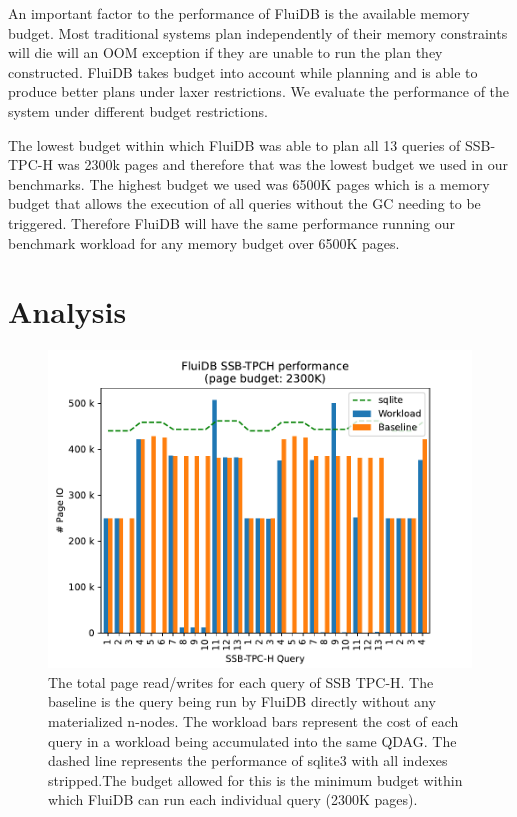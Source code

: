   An important factor to the performance of FluiDB is the available
  memory budget. Most traditional systems plan independently of their
  memory constraints will die will an OOM exception if they are unable
  to run the plan they constructed. FluiDB takes budget into account
  while planning and is able to produce better plans under laxer
  restrictions. We evaluate the performance of the system under
  different budget restrictions.

  The lowest budget within which FluiDB was able to plan all 13
  queries of SSB-TPC-H was 2300k pages and therefore that was the
  lowest budget we used in our benchmarks. The highest budget we used
  was 6500K pages which is a memory budget that allows the execution
  of all queries without the GC needing to be triggered. Therefore
  FluiDB will have the same performance running our benchmark workload
  for any memory budget over 6500K pages.

\section{Analysis}
\newcommand{\ioperfdescr}{The total page read/writes for each query of
  SSB TPC-H. The baseline is the query being run by FluiDB directly
  without any materialized n-nodes. The workload bars represent the
  cost of each query in a workload being accumulated into the same
  QDAG. The dashed line represents the performance of sqlite3 with all
  indexes stripped.}
\begin{figure}[H]
  \centering
  \includegraphics[width=.9\linewidth]{./plans/workload_2300K.pdf}
  \caption{\label{fig:min_budget_plot} \ioperfdescr The budget allowed
    for this is the minimum budget within which FluiDB can run each
    individual query (2300K pages).}
\end{figure}

